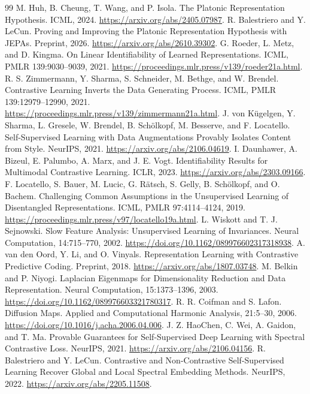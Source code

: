 \documentclass[11pt,a4paper]{article}
\begin{document}
\begin{thebibliography}{99}
 M. Huh, B. Cheung, T. Wang, and P. Isola. The Platonic Representation Hypothesis. ICML, 2024. \url{https://arxiv.org/abs/2405.07987}.
 R. Balestriero and Y. LeCun. Proving and Improving the Platonic Representation Hypothesis with JEPAs. Preprint, 2026. \url{https://arxiv.org/abs/2610.39302}.
 G. Roeder, L. Metz, and D. Kingma. On Linear Identifiability of Learned Representations. ICML, PMLR 139:9030--9039, 2021. \url{https://proceedings.mlr.press/v139/roeder21a.html}.
 R. S. Zimmermann, Y. Sharma, S. Schneider, M. Bethge, and W. Brendel. Contrastive Learning Inverts the Data Generating Process. ICML, PMLR 139:12979--12990, 2021. \url{https://proceedings.mlr.press/v139/zimmermann21a.html}.
 J. von K\"ugelgen, Y. Sharma, L. Gresele, W. Brendel, B. Sch\"olkopf, M. Besserve, and F. Locatello. Self-Supervised Learning with Data Augmentations Provably Isolates Content from Style. NeurIPS, 2021. \url{https://arxiv.org/abs/2106.04619}.
 I. Daunhawer, A. Bizeul, E. Palumbo, A. Marx, and J. E. Vogt. Identifiability Results for Multimodal Contrastive Learning. ICLR, 2023. \url{https://arxiv.org/abs/2303.09166}.
 F. Locatello, S. Bauer, M. Lucic, G. R\"atsch, S. Gelly, B. Sch\"olkopf, and O. Bachem. Challenging Common Assumptions in the Unsupervised Learning of Disentangled Representations. ICML, PMLR 97:4114--4124, 2019. \url{https://proceedings.mlr.press/v97/locatello19a.html}.
 L. Wiskott and T. J. Sejnowski. Slow Feature Analysis: Unsupervised Learning of Invariances. Neural Computation, 14:715--770, 2002. \url{https://doi.org/10.1162/089976602317318938}.
 A. van den Oord, Y. Li, and O. Vinyals. Representation Learning with Contrastive Predictive Coding. Preprint, 2018. \url{https://arxiv.org/abs/1807.03748}.
 M. Belkin and P. Niyogi. Laplacian Eigenmaps for Dimensionality Reduction and Data Representation. Neural Computation, 15:1373--1396, 2003. \url{https://doi.org/10.1162/089976603321780317}.
 R. R. Coifman and S. Lafon. Diffusion Maps. Applied and Computational Harmonic Analysis, 21:5--30, 2006. \url{https://doi.org/10.1016/j.acha.2006.04.006}.
 J. Z. HaoChen, C. Wei, A. Gaidon, and T. Ma. Provable Guarantees for Self-Supervised Deep Learning with Spectral Contrastive Loss. NeurIPS, 2021. \url{https://arxiv.org/abs/2106.04156}.
 R. Balestriero and Y. LeCun. Contrastive and Non-Contrastive Self-Supervised Learning Recover Global and Local Spectral Embedding Methods. NeurIPS, 2022. \url{https://arxiv.org/abs/2205.11508}.

\end{thebibliography}
\end{document}
